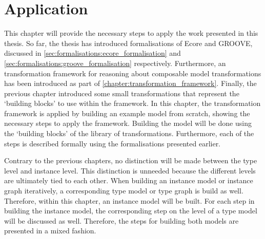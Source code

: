 \chapter{Application}
\label{chapter:application}

This chapter will provide the necessary steps to apply the work presented in this thesis. So far, the thesis has introduced formalisations of Ecore and GROOVE, discussed in \cref{sec:formalisations:ecore_formalisation} and \cref{sec:formalisations:groove_formalisation} respectively. Furthermore, an transformation framework for reasoning about composable model transformations has been introduced as part of \cref{chapter:transformation_framework}. Finally, the previous chapter introduced some small transformations that represent the `building blocks' to use within the framework. In this chapter, the transformation framework is applied by building an example model from scratch, showing the necessary steps to apply the framework. Building the model will be done using the `building blocks' of the library of transformations. Furthermore, each of the steps is described formally using the formalisations presented earlier.

Contrary to the previous chapters, no distinction will be made between the type level and instance level. This distinction is unneeded because the different levels are ultimately tied to each other. When building an instance model or instance graph iteratively, a corresponding type model or type graph is build as well. Therefore, within this chapter, an instance model will be built. For each step in building the instance model, the corresponding step on the level of a type model will be discussed as well. Therefore, the steps for building both models are presented in a mixed fashion.


